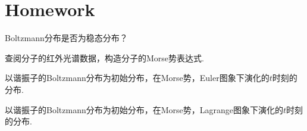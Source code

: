     \section{Homework}
    \begin{asg}
        Boltzmann分布是否为稳态分布？
    \end{asg}
    \begin{asg}
        查阅分子的红外光谱数据，构造分子的Morse势表达式.
    \end{asg}
    \begin{asg}
        以谐振子的Boltzmann分布为初始分布，在Morse势，Euler图象下演化的$t$时刻的分布.
    \end{asg}
    \begin{asg}
        以谐振子的Boltzmann分布为初始分布，在Morse势，Lagrange图象下演化的$t$时刻的分布.
    \end{asg}
    
    